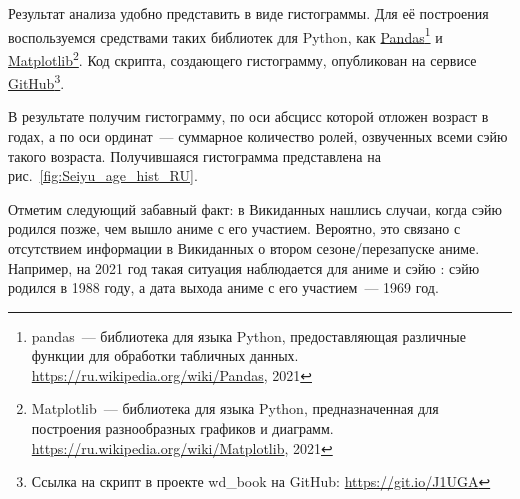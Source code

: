 Результат анализа удобно представить в виде гистограммы. Для её построения воспользуемся средствами таких библиотек для Python, как \href{https://ru.wikipedia.org/wiki/Pandas}{Pandas}\footnote[][-5cm]{pandas~--- библиотека для языка Python, предоставляющая различные функции для обработки табличных данных. \href{https://ru.wikipedia.org/wiki/Pandas}{https://ru.wikipedia.org/wiki/Pandas}, 2021} и \href{https://ru.wikipedia.org/wiki/Matplotlib}{Matplotlib}\footnote[][-2.7cm]{Matplotlib~--- библиотека для языка Python, предназначенная для построения разнообразных графиков и диаграмм. \href{https://ru.wikipedia.org/wiki/Matplotlib}{https://ru.wikipedia.org/wiki/Matplotlib}, 2021}. Код скрипта, создающего гистограмму, опубликован на сервисе \href{https://git.io/J1UGA}{GitHub}\footnote{Ссылка на скрипт в проекте wd\_book на GitHub: \href{https://git.io/J1UGA}{https://git.io/J1UGA}}.

В результате получим гистограмму, по оси абсцисс которой отложен возраст в годах, а по оси ординат~--- суммарное количество ролей, озвученных всеми сэйю такого возраста. Получившаяся гистограмма представлена на рис.~\ref{fig:Seiyu_age_hist_RU}. 

\begin{figure*}[h]

    \setlength{\fboxsep}{0pt}%
    \setlength{\fboxrule}{1pt}%
	\caption[Гистограмма с числом аниме, озвученных сэйю разных возрастов, 2021 года.]{Гистограмма с числом аниме, озвученных сэйю разных возрастов, 2021 год. Гистограмма построена на основе данных, полученных с помощью запросов~\protect\ref{lst:seiyu_bd_w_service} (или~\protect\ref{lst:seiyu_bd_w_rdfs}), \protect\ref{lst:all_anime_releases} и \protect\ref{lst:link_anime_seiyu}.}%
    \label{fig:Seiyu_age_hist_RU}%
\end{figure*} 
 	
Отметим следующий забавный факт: в Викиданных нашлись случаи, когда сэйю родился позже, чем вышло аниме с его участием. Вероятно, это связано с отсутствием информации в Викиданных о втором сезоне/перезапуске аниме. Например, на 2021 год такая ситуация наблюдается для аниме  и сэйю : сэйю родился в 1988 году, а дата выхода аниме с его участием~--- 1969 год.

